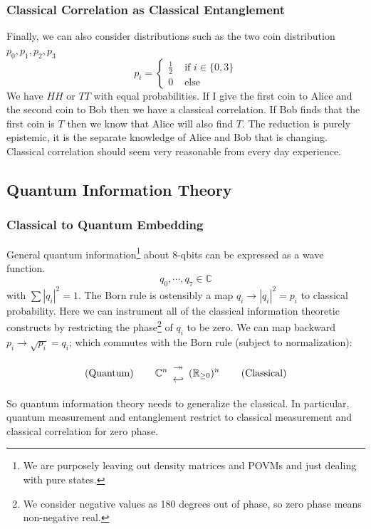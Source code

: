 \documentclass[12pt,a4paper]{article}
\begin{document}
\subsubsection{Classical Correlation as Classical Entanglement}
Finally, we can also consider distributions such as the two coin distribution $p_0,p_1,p_2,p_3$
\[
p_i = 
\left\{
\begin{split}
\frac{1}{2} & \mbox{ if } i \in \{0,3\}\\
0 &\mbox{ else }
\end{split}
\right.
\]
We have $HH$ or $TT$ with equal probabilities.  If I give the first coin to Alice and the second coin to Bob then we have a classical correlation.  If Bob finds that the first coin is $T$ then we know that Alice will also find $T$.  The reduction is purely epistemic, it is the separate knowledge of Alice and Bob that is changing.  Classical correlation should seem very reasonable from every day experience.

\subsection{Quantum Information Theory}
\subsubsection{Classical to Quantum Embedding}
General quantum information\footnote{We are purposely leaving out density matrices and POVMs and just dealing with pure states.} about 8-qbits can be expressed as a wave function.
\[
   q_0,\cdots,q_{7} \in \mathbb{C}
\]
with $\sum |q_i|^2 = 1$.  The Born rule is ostensibly a map $q_i \rightarrow |q_i|^2 = p_i$ to classical probability.  Here we can instrument all of the classical information theoretic constructs by restricting the phase\footnote{We consider negative values as 180 degrees out of phase, so zero phase means non-negative real.} of $q_i$ to be zero.  We can map backward $p_i \rightarrow \sqrt{p_i} = q_i$; which commutes with the Born rule (subject to normalization):

{
\renewcommand{\arraystretch}{0.1}
\[
\text{(Quantum)} \hspace{0.3 in}
\mathbb{C}^n \begin{array}{c} \twoheadrightarrow \\ \hookleftarrow \end{array}
(\mathbb{R}_{\ge 0})^n
\hspace{0.3 in} \text{(Classical)} 
\]
}

So quantum information theory needs to generalize the classical.  In particular, quantum measurement and entanglement restrict to classical measurement and classical correlation for zero phase.
\end{document}
